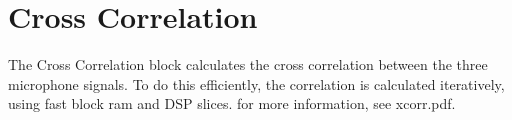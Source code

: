 \section{Cross Correlation}
\label{sec::xcorr}

The Cross Correlation block calculates the cross correlation between the three microphone signals.
To do this efficiently, the correlation is calculated iteratively, using fast block ram and DSP slices.
for more information, see xcorr.pdf.
